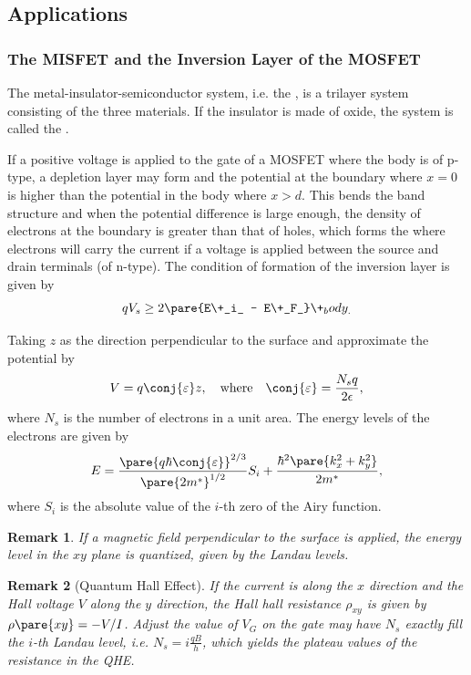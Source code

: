 \documentclass[hidelinks]{article}
\newtheorem{remark}{Remark}
\begin{document}
\subsection{Applications} %
\label{sub:applications}

\subsubsection{The MISFET and the Inversion Layer of the MOSFET} %
\label{ssub:the_misfet_and_the_inversion_layer_of_the_mosfet}

The metal-insulator-semiconductor system, i.e. the , is a trilayer system consisting of the three materials. If the insulator is made of oxide, the system is called the .
\par
If a positive voltage is applied to the gate of a MOSFET where the body is of p-type, a depletion layer may form and the potential at the boundary where $x=0$ is higher than the potential in the body where $x>d$. This bends the band structure and when the potential difference is large enough, the density of electrons at the boundary is greater than that of holes, which forms the  where electrons will carry the current if a voltage is applied between the source and drain terminals (of n-type). The condition of formation of the inversion layer is given by
\[ qV_s \ge 2\pare{E\+_i_ - E\+_F_}\+_body_. \]
\par
Taking $z$ as the direction perpendicular to the surface and approximate the potential by
\[ V = q\conj{\varepsilon}z,\quad \text{where}\quad \conj{\varepsilon} = \frac{N_s q}{2\epsilon}, \]
where $N_s$ is the number of electrons in a unit area. The energy levels of the electrons are given by
\[ E = \frac{\pare{q\hbar \conj{\varepsilon}}^{2/3}}{\pare{2m^*}^{1/2}}S_i + \frac{\hbar^2 \pare{k_x^2 + k_y^2}}{2m^*}, \]
where $S_i$ is the absolute value of the $i$-th zero of the Airy function.
\begin{remark}
    If a magnetic field perpendicular to the surface is applied, the energy level in the $xy$ plane is quantized, given by the Landau levels.
\end{remark}
\begin{remark}[Quantum Hall Effect]
    If the current is along the $x$ direction and the Hall voltage $V$ along the $y$ direction, the Hall hall resistance $\rho_{xy}$ is given by $\rho\pare{xy} = -V/I$. Adjust the value of $V_G$ on the gate may have $N_s$ exactly fill the $i$-th Landau level, i.e. $\displaystyle N_s = i\frac{qB}{h}$, which yields the plateau values of the resistance in the QHE.
\end{remark}
\end{document}
